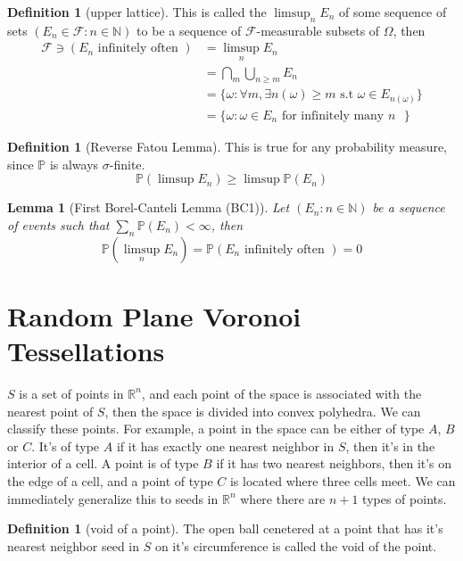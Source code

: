 \documentclass{tufte-handout}
\newtheorem{lem}[thm]{Lemma}
\theoremstyle{definition}
\newtheorem{defn}[thm]{Definition}
\theoremstyle{remark}
\begin{document}
\begin{defn}[upper lattice]
	This is called the $\limsup_{n} E_n$ of some sequence of sets $(E_n \in \mathcal{F} \colon n \in \mathbb{N})$ to be a sequence of $\mathcal{F}$-measurable subsets of $\Omega$, then 
	\begin{align*}
		\mathcal{F} \ni (E_n \text{ infinitely often } )  &= \limsup_{n} E_n \\
								  &= \bigcap_{m} \bigcup_{n \geq m} E_n\\
								  &= \{ \omega \colon \forall m, \exists n(\omega) \geq m \text{ s.t } \omega \in E_{n(\omega)}\}\\
								  &= \{ \omega \colon \omega \in E_n \text{ for infinitely many $n$ } \}
	\end{align*}
	

\end{defn}
\begin{defn}[Reverse Fatou Lemma]
	This is true for any probability measure, since $\mathbb{P}$ is always $\sigma$-finite. 
	$$\mathbb{P}(\limsup E_n) \geq \limsup \mathbb{P}(E_n)$$
		
\end{defn}
\begin{lem}[First Borel-Canteli Lemma (BC1)]
	Let $(E_n \colon n \in \mathbb{N})$ be a sequence of events such that $\sum_{n} \mathbb{P}(E_n) < \infty$, then 
	$$ \mathbb{P}(\limsup_{n} E_n) = \mathbb{P}(E_n \text{ infinitely often }) = 0$$

\end{lem}
\section*{Random Plane Voronoi Tessellations}

$S$ is a set of points in $\mathbb{R}^n$, and each point of the space is associated with the nearest point of $S$, then the space is divided into convex polyhedra. We can classify these points. For example, a point in the space can be either of type $A$, $B$ or $C$. It's of type $A$ if it has exactly one nearest neighbor in $S$, then it's in the interior of a cell. A point is of type $B$ if it has two nearest neighbors, then it's on the edge of a cell, and a point of type $C$ is located where three cells meet. We can immediately generalize this to seeds in $\mathbb{R}^n$ where there are $n+1$ types of points. 

\begin{defn}[void of a point]
	The open ball cenetered at a point that has it's nearest neighbor seed in $S$ on it's circumference is called the void of the point.
\end{defn}
\end{document}
